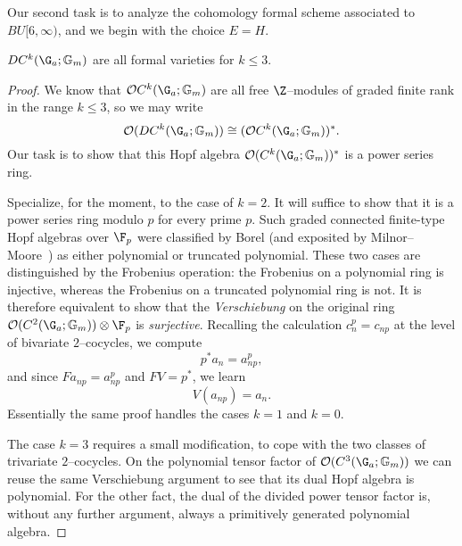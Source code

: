 Our second task is to analyze the cohomology formal scheme associated to $BU[6, \infty)$, and we begin with the choice $E = H$.

\begin{lemma}\label{CkGaGmAreFVars}
$DC^k(\G_a; \Gm)$ are all formal varieties for $k \le 3$.
\end{lemma}
\begin{proof}
We know that $\sheaf O C^k(\G_a; \Gm)$ are all free $\Z$--modules of graded finite rank in the range $k \le 3$, so we may write \[\sheaf O(D C^k(\G_a; \Gm)) \cong (\sheaf O C^k(\G_a; \Gm))^*.\]  Our task is to show that this Hopf algebra $\sheaf O(C^k(\G_a; \Gm))^*$ is a power series ring.

Specialize, for the moment, to the case of $k = 2$.  It will suffice to show that it is a power series ring modulo $p$ for every prime $p$.  Such graded connected finite-type Hopf algebras over $\F_p$ were classified by Borel (and exposited by Milnor--Moore~\cite[Theorem 7.11]{MilnorMoore}) as either polynomial or truncated polynomial.  These two cases are distinguished by the Frobenius operation: the Frobenius on a polynomial ring is injective, whereas the Frobenius on a truncated polynomial ring is not.  It is therefore equivalent to show that the \emph{Verschiebung} on the original ring $\sheaf O(C^2(\G_a; \Gm)) \otimes \F_p$ is \emph{surjective}.  Recalling the calculation $c_n^p = c_{np}$ at the level of bivariate $2$--cocycles, we compute \[p^* a_n = a_{np}^p,\] and since $F a_{np} = a_{np}^p$ and $FV = p^*$, we learn \[V(a_{np}) = a_n.\]  Essentially the same proof handles the cases $k = 1$ and $k = 0$.

The case $k = 3$ requires a small modification, to cope with the two classes of trivariate $2$--cocycles.  On the polynomial tensor factor of $\sheaf O(C^3(\G_a; \Gm))$ we can reuse the same Verschiebung argument to see that its dual Hopf algebra is polynomial.  For the other fact, the dual of the divided power tensor factor is, without any further argument, always a primitively generated polynomial algebra.
\end{proof}

